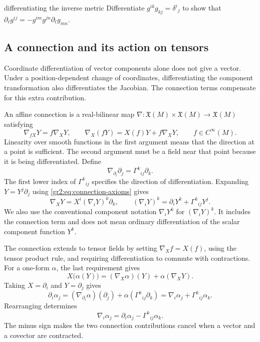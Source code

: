 \documentclass[11pt,a4paper]{article}
\numberwithin{equation}{section}
\newcommand{\Cinf}{C^\infty}
\newcommand{\X}{\mathfrak X}
\newcommand{\slidesref}[1]{\par\nobreak\smallskip\nobreak{\footnotesize\color{ink!60}\textsc{Source slides #1}}\par\nobreak\smallskip\nobreak}
\begin{document}
\begin{studentwork}[2.6cm]{differentiating the inverse metric}
Differentiate \(g^{ik}g_{kj}=\delta^i{}_j\) to show that
\(\partial_\ell g^{ij}=-g^{im}g^{jn}\partial_\ell g_{mn}\).
\end{studentwork}

\subsection{A connection and its action on tensors}
\slidesref{4--6}

Coordinate differentiation of vector components alone does not give a
vector. Under a position-dependent change of coordinates, differentiating
the component transformation also differentiates the Jacobian. The
connection terms compensate for this extra contribution.

An affine connection is a real-bilinear map
\(\nabla:\X(M)\times\X(M)\to\X(M)\) satisfying
\begin{equation}
 \nabla_{fX}Y=f\nabla_XY,
 \qquad
 \nabla_X(fY)=X(f)Y+f\nabla_XY,
 \qquad f\in\Cinf(M).
 \label{gr2:eq:connection-axioms}
\end{equation}
Linearity over smooth functions in the first argument means that the
direction at a point is sufficient. The second argument must be a field
near that point because it is being differentiated. Define
\[
 \nabla_{\partial_i}\partial_j=\Gamma^k{}_{ij}\partial_k.
\]
The first lower index of \(\Gamma^k{}_{ij}\) specifies the direction of
differentiation. Expanding \(Y=Y^j\partial_j\) using
\eqref{gr2:eq:connection-axioms} gives
\begin{equation}
 \nabla_XY=X^i(\nabla_iY)^k\partial_k,
 \qquad
 (\nabla_iY)^k=\partial_iY^k+\Gamma^k{}_{ij}Y^j.
 \label{gr2:eq:vector-derivative}
\end{equation}
We also use the conventional component notation \(\nabla_iY^k\) for
\((\nabla_iY)^k\). It includes the connection term and does not mean
ordinary differentiation of the scalar component function \(Y^k\).

The connection extends to tensor fields by setting \(\nabla_Xf=X(f)\),
using the tensor product rule, and requiring differentiation to commute
with contractions. For a one-form \(\alpha\), the last requirement gives
\[
 X\bigl(\alpha(Y)\bigr)
 =(\nabla_X\alpha)(Y)+\alpha(\nabla_XY).
\]
Taking \(X=\partial_i\) and \(Y=\partial_j\) gives
\[
 \partial_i\alpha_j
 =(\nabla_{\partial_i}\alpha)(\partial_j)
   +\alpha(\Gamma^k{}_{ij}\partial_k)
 =\nabla_i\alpha_j+\Gamma^k{}_{ij}\alpha_k.
\]
Rearranging determines
\begin{equation}
 \nabla_i\alpha_j=\partial_i\alpha_j-\Gamma^k{}_{ij}\alpha_k.
 \label{gr2:eq:covector-derivative}
\end{equation}
The minus sign makes the two connection contributions cancel when a
vector and a covector are contracted.
\end{document}
